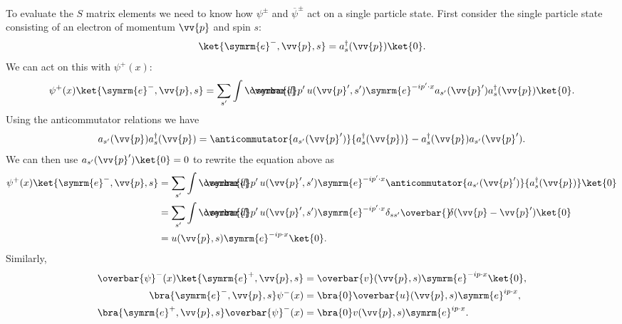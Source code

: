 \documentclass[fleqn]{NotesClass}
\makeatletter
\newcommand{\@particlefont}{\symrm}
\newcommand{\Pe}{\ensuremath{\@particlefont{e}^{-}}}
\newcommand{\APe}{\ensuremath{\@particlefont{e}^{+}}}
\newcommand{\e}{\symrm{e}}
\newcommand{\hermit}{{\dagger}}
\newcommand{\dbar}[1][0.0]{\ThisStyle{\ensurestackMath{%
            \stackengine{#1\LMex}{\SavedStyle \symrm{d}}{\SavedStyle\overbar{}%
                \mkern2.25mu}{O}{r}{F}{F}{L}}}}
\newcommand{\invariantmeasure}[1]{%
    \mathchoice{\dbar #1}{\dbar #1}{\dbar[.05] #1}{\dbar[.06] #1}
}
\newcommand\bardelta{\ThisStyle{\ensurestackMath{%
            \stackengine{-.3\LMpt}{\SavedStyle \delta}{\SavedStyle\overbar{}%
                \mkern4.5mu}{O}{r}{F}{F}{L}}}}
\newcommand{\diracadjoint}[1]{\overbar{#1}}
\makeatother
\begin{document}
    To evaluate the \(S\) matrix elements we need to know how \(\psi^{\pm}\) and \(\diracadjoint{\psi}^{\pm}\) act on a single particle state.
    First consider the single particle state consisting of an electron of momentum \(\vv{p}\) and spin \(s\):
    \begin{equation}
        \ket{\Pe, \vv{p}, s} = a_s^\hermit(\vv{p}) \ket{0}.
    \end{equation}
    We can act on this with \(\psi^+(x)\):
    \begin{equation}
        \psi^+(x) \ket{\Pe, \vv{p}, s} = \sum_{s'} \int \invariantmeasure{p'} \, u(\vv{p}', s') \e^{-ip'\cdot x} a_{s'}(\vv{p}') a_{s}^\hermit(\vv{p}) \ket{0}.
    \end{equation}
    Using the anticommutator relations we have
    \begin{equation}
        a_{s'}(\vv{p}) a_{s}^\hermit(\vv{p}) = \anticommutator{a_{s'}(\vv{p}')}{a_{s}^\hermit(\vv{p})} - a_{s}^\hermit(\vv{p}) a_{s'}(\vv{p}').
    \end{equation}
    We can then use \(a_{s'}(\vv{p}') \ket{0} = 0\) to rewrite the equation above as
    \begin{align}
        \psi^+(x) \ket{\Pe, \vv{p}, s} &= \sum_{s'} \int \invariantmeasure{p'} \, u(\vv{p}', s') \e^{-ip'\cdot x} \anticommutator{a_{s'}(\vv{p}')}{a_s^\hermit(\vv{p})} \ket{0}\\
        &= \sum_{s'} \int \invariantmeasure{p'} \, u(\vv{p}', s') \e^{-ip'\cdot x} \delta_{ss'} \bardelta(\vv{p} - \vv{p}') \ket{0}\\
        &= u(\vv{p}, s) \e^{-ip\cdot x} \ket{0}.
    \end{align}
    Similarly,
    \begin{align}
        \diracadjoint{\psi}^-(x) \ket{\APe, \vv{p}, s} &= \diracadjoint{v}(\vv{p}, s) \e^{-ip\cdot x} \ket{0},\\
        \bra{\Pe, \vv{p}, s}\psi^-(x) &= \bra{0} \diracadjoint{u}(\vv{p}, s) \e^{ip\cdot x},\\
        \bra{\APe, \vv{p}, s}\diracadjoint{\psi}^-(x) &= \bra{0} v(\vv{p}, s) \e^{ip\cdot x}.
    \end{align}
    
\end{document}
